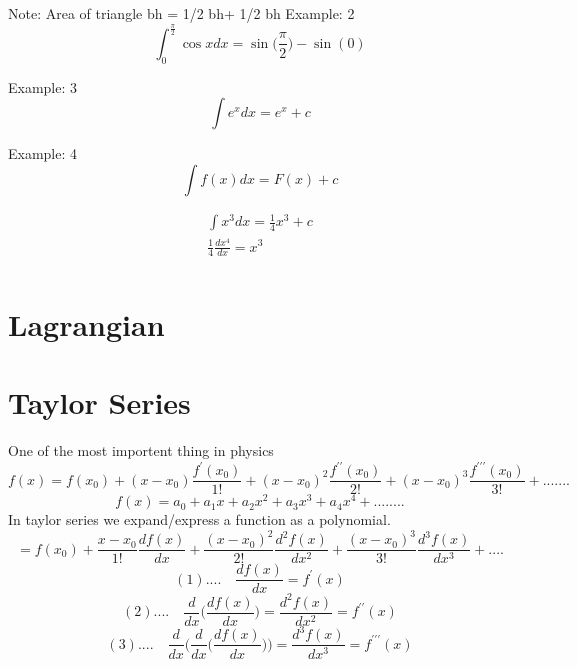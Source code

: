 Note: Area of triangle bh = 1/2 bh+ 1/2 bh
\newline
Example: 2
\begin{equation}
	\int_{0}^{\frac{\pi}{2}}\cos xdx = \sin\big(\frac{\pi}{2}\big) - \sin(0)
\end{equation}

Example: 3
\begin{equation}
	\int e^x dx = e^x+c
\end{equation}

Example: 4
\begin{equation}
	\int f(x)dx=F(x)+c
\end{equation}

\begin{align}
	\int x^3 dx = \frac{1}{4}x^3+c \\
	\frac{1}{4}\frac{dx^4}{dx} = x^3 \\	
\end{align}




\section{Lagrangian}






\section{Taylor Series}

One of the most importent thing in physics
\begin{equation}
	f(x) = f(x_0)+(x-x_0)\frac{f^\prime(x_0)}{1!}+(x-x_0)^2\frac{f^{\prime\prime}(x_0)}{2!}+(x-x_0)^3\frac{f^{\prime\prime\prime}(x_0)}{3!}+.......
\end{equation}
\begin{equation}
	f(x) = a_0+a_1x+a_2x^2+a_3x^3+a_4x^4+........
\end{equation}
In taylor series we expand/express a function as a polynomial.
\newline
\begin{equation}
	=f(x_0)+\frac{x-x_0}{1!}\frac{df(x)}{dx}+\frac{(x-x_0)^2}{2!}\frac{d^2f(x)}{dx^2}+\frac{(x-x_0)^3}{3!}\frac{d^3f(x)}{dx^3}+....
\end{equation}
\begin{equation}
	(1).... \quad \frac{df(x)}{dx} = f^\prime(x)
\end{equation}
\begin{equation}
	(2).... \quad \frac{d}{dx}\bigg(\frac{df(x)}{dx}\bigg) = \frac{d^2f(x)}{dx^2} = f^{\prime\prime}(x)
\end{equation}
\begin{equation}
	(3).... \quad \frac{d}{dx}\bigg(\frac{d}{dx}\bigg(\frac{df(x)}{dx}\bigg)\bigg) = \frac{d^3f(x)}{dx^3} = f^{\prime\prime\prime}(x)
\end{equation}

